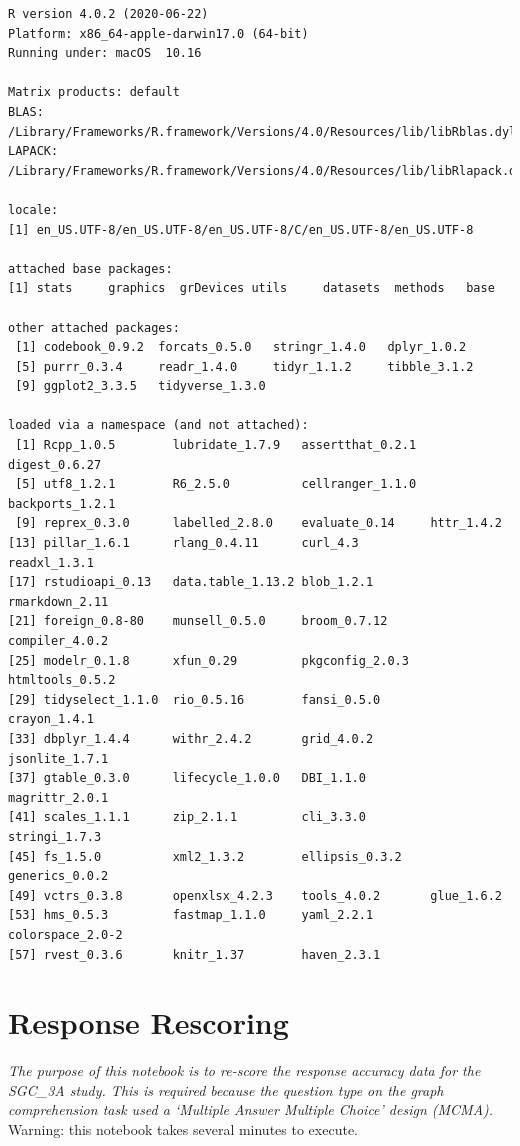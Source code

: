 \documentclass[
  letterpaper,
  DIV=11,
  numbers=noendperiod]{scrreprt}
\begin{document}
\begin{verbatim}
R version 4.0.2 (2020-06-22)
Platform: x86_64-apple-darwin17.0 (64-bit)
Running under: macOS  10.16

Matrix products: default
BLAS:   /Library/Frameworks/R.framework/Versions/4.0/Resources/lib/libRblas.dylib
LAPACK: /Library/Frameworks/R.framework/Versions/4.0/Resources/lib/libRlapack.dylib

locale:
[1] en_US.UTF-8/en_US.UTF-8/en_US.UTF-8/C/en_US.UTF-8/en_US.UTF-8

attached base packages:
[1] stats     graphics  grDevices utils     datasets  methods   base     

other attached packages:
 [1] codebook_0.9.2  forcats_0.5.0   stringr_1.4.0   dplyr_1.0.2    
 [5] purrr_0.3.4     readr_1.4.0     tidyr_1.1.2     tibble_3.1.2   
 [9] ggplot2_3.3.5   tidyverse_1.3.0

loaded via a namespace (and not attached):
 [1] Rcpp_1.0.5        lubridate_1.7.9   assertthat_0.2.1  digest_0.6.27    
 [5] utf8_1.2.1        R6_2.5.0          cellranger_1.1.0  backports_1.2.1  
 [9] reprex_0.3.0      labelled_2.8.0    evaluate_0.14     httr_1.4.2       
[13] pillar_1.6.1      rlang_0.4.11      curl_4.3          readxl_1.3.1     
[17] rstudioapi_0.13   data.table_1.13.2 blob_1.2.1        rmarkdown_2.11   
[21] foreign_0.8-80    munsell_0.5.0     broom_0.7.12      compiler_4.0.2   
[25] modelr_0.1.8      xfun_0.29         pkgconfig_2.0.3   htmltools_0.5.2  
[29] tidyselect_1.1.0  rio_0.5.16        fansi_0.5.0       crayon_1.4.1     
[33] dbplyr_1.4.4      withr_2.4.2       grid_4.0.2        jsonlite_1.7.1   
[37] gtable_0.3.0      lifecycle_1.0.0   DBI_1.1.0         magrittr_2.0.1   
[41] scales_1.1.1      zip_2.1.1         cli_3.3.0         stringi_1.7.3    
[45] fs_1.5.0          xml2_1.3.2        ellipsis_0.3.2    generics_0.0.2   
[49] vctrs_0.3.8       openxlsx_4.2.3    tools_4.0.2       glue_1.6.2       
[53] hms_0.5.3         fastmap_1.1.0     yaml_2.2.1        colorspace_2.0-2 
[57] rvest_0.3.6       knitr_1.37        haven_2.3.1      
\end{verbatim}

\hypertarget{response-rescoring}{%
\chapter{Response Rescoring}\label{response-rescoring}}

\newpage

\emph{The purpose of this notebook is to re-score the response accuracy
data for the SGC\_3A study. This is required because the question type
on the graph comprehension task used a `Multiple Answer Multiple Choice'
design (MCMA).} Warning: this notebook takes several minutes to execute.
\end{document}
